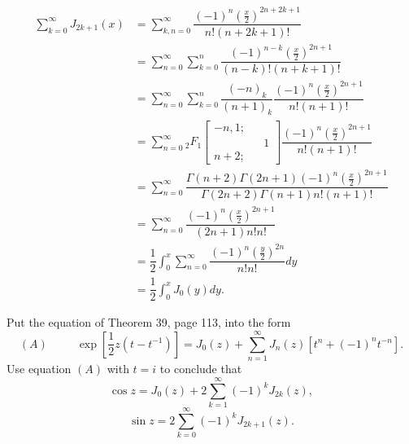 \begin{solution}
$$\begin{array}{ll}
\displaystyle\sum_{k=0}^{\infty} J_{2k+1}(x) &= \displaystyle\sum_{k,n=0}^{\infty} \dfrac{(-1)^n (\frac{x}{2})^{2n+2k+1}}{n! (n+2k+1)!} \\
&= \displaystyle\sum_{n=0}^{\infty} \displaystyle\sum_{k=0}^{n} \dfrac{(-1)^{n-k}(\frac{x}{2})^{2n+1}}{(n-k)! (n+k+1)!} \\
&= \displaystyle\sum_{n=0}^{\infty} \displaystyle\sum_{k=0}^{n} \dfrac{(-n)_k}{(n+1)_k} \dfrac{(-1)^n (\frac{x}{2})^{2n+1}}{n! (n+1)!} \\
&= \displaystyle\sum_{n=0}^{\infty} {}_2F_1 \left[ \begin{array}{rlr}
-n, 1; & & \\
& & 1 \\
n+2; & &
\end{array} \right] \dfrac{(-1)^n (\frac{x}{2})^{2n+1}}{n! (n+1)!} \\
&= \displaystyle\sum_{n=0}^{\infty} \dfrac{\Gamma(n+2) \Gamma(2n+1) (-1)^n (\frac{x}{2})^{2n+1}}{\Gamma(2n+2) \Gamma(n+1) n! (n+1)!} \\
&= \displaystyle\sum_{n=0}^{\infty} \dfrac{(-1)^n (\frac{x}{2})^{2n+1}}{(2n+1)n! n!} \\
&= \dfrac{1}{2} \displaystyle\int_0^x \displaystyle\sum_{n=0}^{\infty} \dfrac{(-1)^n (\frac{y}{2})^{2n}}{n! n!} dy \\
&= \dfrac{1}{2} \displaystyle\int_0^x J_0(y) dy.
\end{array}$$
\end{solution}
\begin{problem}\label{problem2chapter6}
Put the equation of Theorem 39, page 113, into the form
$$(A) \hspace{30pt} \exp \left[ \dfrac{1}{2}z(t-t^{-1}) \right] = J_0(z) + \displaystyle\sum_{n=1}^{\infty} J_n(z)[t^n+(-1)^nt^{-n}].$$
Use equation $(A)$ with $t=i$ to conclude that
$$\cos z = J_0(z) + 2 \displaystyle\sum_{k=1}^{\infty} (-1)^k J_{2k}(z),$$
$$\sin z = 2 \displaystyle\sum_{k=0}^{\infty} (-1)^k J_{2k+1}(z).$$
\end{problem}
